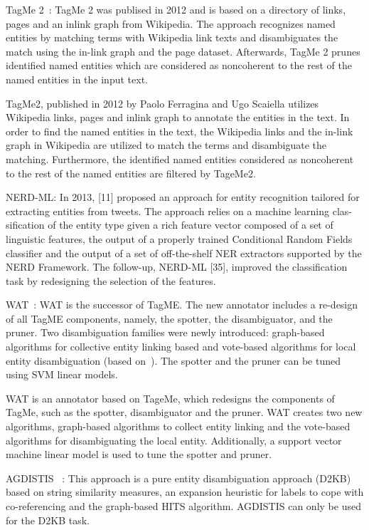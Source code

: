 TagMe 2~\cite{DBLP:journals/software/FerraginaS12}: TagMe 2 was publised in 2012 and is based on a directory of links, pages and an inlink graph from Wikipedia. The approach recognizes named entities by matching terms with Wikipedia link texts and disambiguates the match using the in-link graph and the page dataset. Afterwards, TagMe 2 prunes identified named entities which are considered as noncoherent to the rest of the named entities in the input text.

TagMe2, published in 2012 by Paolo Ferragina and Ugo Scaiella utilizes Wikipedia links, pages and inlink graph to annotate the entities in the text. In order to find the named entities in the text, the Wikipedia links and the in-link graph in Wikipedia are utilized to match the terms and disambiguate the matching. Furthermore, the identified named entities considered as noncoherent to the rest of the named entities are filtered by TageMe2.

NERD-ML: In 2013, [11] proposed an approach for entity recognition tailored for extracting entities from tweets. The approach relies on a machine learning clas- sification of the entity type given a rich feature vector composed of a set of linguistic features, the output of a properly trained Conditional Random Fields classifier and the output of a set of off-the-shelf NER extractors supported by the NERD Framework. The follow-up, NERD-ML [35], improved the classification task by redesigning the selection of the features. 

WAT~\cite{DBLP:conf/sigir/PiccinnoF14}: WAT is the successor of TagME. The
new annotator includes a re-design of all TagME components,
namely, the spotter, the disambiguator, and
the pruner. Two disambiguation families were newly
introduced: graph-based algorithms for collective entity
linking based and vote-based algorithms for local
entity disambiguation (based on~\cite{DBLP:journals/software/FerraginaS12}). The spotter and the pruner can be
tuned using SVM linear models.

WAT is an annotator based on TageMe, which redesigns the components of TagMe, such as the spotter, disambiguator and the pruner. WAT creates two new algorithms, graph-based algorithms to collect entity linking and the vote-based algorithms for disambiguating the local entity. Additionally, a support vector machine linear model is used to tune the spotter and pruner.


AGDISTIS~\cite{DBLP:conf/semweb/UsbeckNRGCAB14}	: This approach is a pure entity disambiguation approach (D2KB) based on string similarity measures, an expansion heuristic for labels to cope with co-referencing and the graph-based HITS algorithm. AGDISTIS can only
be used for the D2KB task.